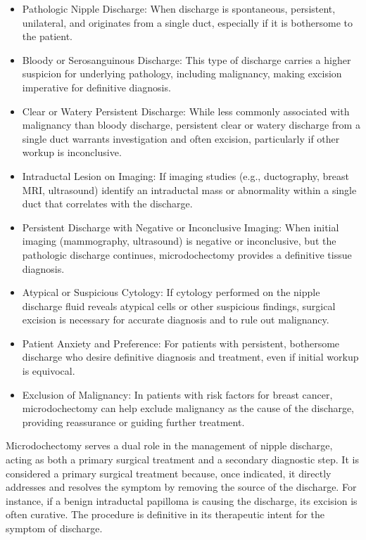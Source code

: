 \begin{itemize}
  \item Pathologic Nipple Discharge: When discharge is spontaneous, persistent, unilateral, and originates from a single duct, especially if it is bothersome to the patient.
  \item Bloody or Serosanguinous Discharge: This type of discharge carries a higher suspicion for underlying pathology, including malignancy, making excision imperative for definitive diagnosis.
  \item Clear or Watery Persistent Discharge: While less commonly associated with malignancy than bloody discharge, persistent clear or watery discharge from a single duct warrants investigation and often excision, particularly if other workup is inconclusive.
  \item Intraductal Lesion on Imaging: If imaging studies (e.g., ductography, breast MRI, ultrasound) identify an intraductal mass or abnormality within a single duct that correlates with the discharge.
  \item Persistent Discharge with Negative or Inconclusive Imaging: When initial imaging (mammography, ultrasound) is negative or inconclusive, but the pathologic discharge continues, microdochectomy provides a definitive tissue diagnosis.
  \item Atypical or Suspicious Cytology: If cytology performed on the nipple discharge fluid reveals atypical cells or other suspicious findings, surgical excision is necessary for accurate diagnosis and to rule out malignancy.
  \item Patient Anxiety and Preference: For patients with persistent, bothersome discharge who desire definitive diagnosis and treatment, even if initial workup is equivocal.
  \item Exclusion of Malignancy: In patients with risk factors for breast cancer, microdochectomy can help exclude malignancy as the cause of the discharge, providing reassurance or guiding further treatment.
\end{itemize}

Microdochectomy serves a dual role in the management of nipple discharge, acting as both a primary surgical treatment and a secondary diagnostic step. It is considered a primary surgical treatment because, once indicated, it directly addresses and resolves the symptom by removing the source of the discharge. For instance, if a benign intraductal papilloma is causing the discharge, its excision is often curative. The procedure is definitive in its therapeutic intent for the symptom of discharge.

